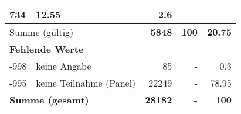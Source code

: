 \begin{longtable}{lXrrr}
       \num{734} &
       \num[round-mode=places,round-precision=2]{12.55} &
         \num[round-mode=places,round-precision=2]{2.6} \\
     \midrule
     \multicolumn{2}{l}{Summe (gültig)} &
       \textbf{\num{5848}} &
     \textbf{100} &
       \textbf{\num[round-mode=places,round-precision=2]{20.75}} \\
     \multicolumn{5}{l}{\textbf{Fehlende Werte}}\\
       -998 &
       keine Angabe &
         \num{85} &
        - &
         \num[round-mode=places,round-precision=2]{0.3} \\
       -995 &
       keine Teilnahme (Panel) &
         \num{22249} &
        - &
         \num[round-mode=places,round-precision=2]{78.95} \\
     \midrule
     \multicolumn{2}{l}{\textbf{Summe (gesamt)}} &
          \textbf{\num{28182}} &
        \textbf{-} &
        \textbf{100} \\
     \bottomrule
     \end{longtable}
     
